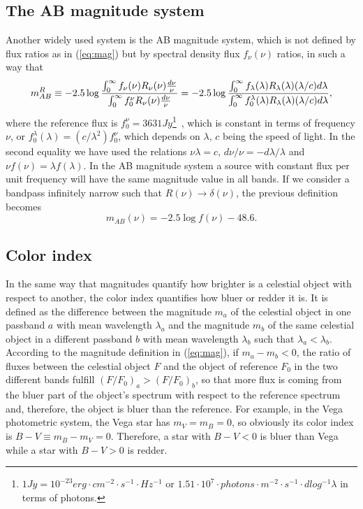 \subsection{The AB magnitude system}
Another widely used system is the AB magnitude system, which is not defined by flux ratios as in (\ref{eq:mag}) but by spectral density flux $f_\nu(\nu)$ ratios, in such a way that
\begin{equation}
m^R_{AB} \equiv -2.5\log{ \int^{\infty}_0 f_\nu(\nu)R_\nu(\nu){d\nu \over \nu} \over \int^{\infty}_0 f^\nu_0 R_\nu(\nu) {d\nu \over \nu}} = -2.5\log{ \int^{\infty}_0 f_\lambda(\lambda)R_\lambda (\lambda)  (\lambda / c) d\lambda \over \int^{\infty}_0 f^\lambda_0 (\lambda) R_\lambda (\lambda) (\lambda / c) d\lambda},
\label{eq:magAB}
\end{equation}
where the reference flux is $f^\nu_0=3631Jy$\footnote{$1Jy = 10^{-23}erg \cdot cm^{-2} \cdot s^{-1} \cdot Hz^{-1}$  or $1.51 \cdot 10^7 \cdot photons \cdot m^{-2} \cdot s^{-1} \cdot dlog^{-1}\lambda$ in terms of photons.}~\citep{Oke1983}, which is constant in terms of frequency $\nu$, or $f^\lambda_0 (\lambda) = (c/\lambda^2) f^\nu_0$, which depends on $\lambda$, $c$ being the speed of light. In the second equality we have used the relations $\nu \lambda =c$, $d\nu / \nu = -d\lambda / \lambda$ and $\nu f(\nu) = \lambda f(\lambda)$. In the AB magnitude system a source with constant flux per unit frequency will have the same magnitude value in all bands. If we consider a bandpass infinitely narrow such that $R(\nu) \rightarrow \delta(\nu)$, the previous definition becomes
\begin{equation}
m_{AB}(\nu) = -2.5 \log f(\nu) - 48.6.
\end{equation}

\subsection{Color index}
In the same way that magnitudes quantify how brighter is a celestial object with respect to another, the color index quantifies how bluer or redder it is. It is defined as the difference between the magnitude $m_a$ of the celestial object in one passband $a$ with mean wavelength $\lambda_a$ and the magnitude $m_b$ of the same celestial object in a different passband $b$ with mean wavelength $\lambda_b$ such that $\lambda_a<\lambda_b$. According to the magnitude definition in (\ref{eq:mag}), if $m_a-m_b<0$, the ratio of fluxes between the celestial object $F$ and the object of reference $F_0$ in the two different bands fulfill $(F/F_0)_a>(F/F_0)_b$, so that more flux is coming from the bluer part of the object's spectrum with respect to the reference spectrum and, therefore, the object is bluer than the reference. For example, in the Vega photometric system, the Vega star has $m_V = m_B = 0$, so obviously its color index is $B-V \equiv m_B-m_V = 0$. Therefore, a star with $B-V<0$ is bluer than Vega while a star with $B-V>0$ is redder. 

